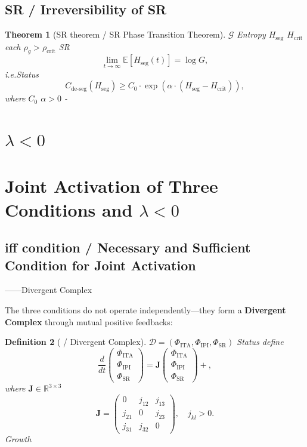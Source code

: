 \documentclass[11pt,a4paper]{article}
\newtheorem{theorem}{Theorem}[section]
\newtheorem{definition}[theorem]{Definition}
\theoremstyle{remark}
\newcommand{\R}{\mathbb{R}}
\newcommand{\E}{\mathbb{E}}
\newcommand{\paren}[1]{\left(#1\right)}
\newcommand{\lambdaparam}{\lambda}
\begin{document}
\subsection{SR  / Irreversibility of SR}

\begin{theorem}[SR theorem / SR Phase Transition Theorem]
\label{thm:SR_irreversible}
 $\mathcal{G}$ Entropy $H_{\text{seg}}$  $H_{\text{crit}}$
each $\rho_g > \rho_{\text{crit}}$ SR 
\[
\lim_{t \to \infty} \E[H_{\text{seg}}(t)] = \log G,
\]
i.e.Status
\[
C_{\text{de-seg}}(H_{\text{seg}}) \geq C_0 \cdot \exp\paren{\alpha \cdot (H_{\text{seg}} - H_{\text{crit}})},
\]
where $C_0$ $\alpha > 0$ -
\end{theorem}

\section{ $\lambdaparam < 0$}
\section{Joint Activation of Three Conditions and $\lambdaparam < 0$}

\subsection{iff condition / Necessary and Sufficient Condition for Joint Activation}

——\textbf{}Divergent Complex

The three conditions do not operate independently—they form a
\textbf{Divergent Complex} through mutual positive feedbacks:

\begin{definition}[ / Divergent Complex]
\label{def:divergent_complex}
 $\mathcal{D} = (\Phi_{\text{ITA}}, \Phi_{\text{IPI}}, \Phi_{\text{SR}})$ Status
define
\[
\frac{d}{dt}
\begin{pmatrix}
\Phi_{\text{ITA}} \\ \Phi_{\text{IPI}} \\ \Phi_{\text{SR}}
\end{pmatrix}
= \mathbf{J}
\begin{pmatrix}
\Phi_{\text{ITA}} \\ \Phi_{\text{IPI}} \\ \Phi_{\text{SR}}
\end{pmatrix}
+ \text{},
\]
where $\mathbf{J} \in \R^{3 \times 3}$ 
\[
\mathbf{J} =
\begin{pmatrix}
0 & j_{12} & j_{13} \\
j_{21} & 0 & j_{23} \\
j_{31} & j_{32} & 0
\end{pmatrix},
\quad j_{kl} > 0.
\]
Growth
\end{definition}
\end{document}

